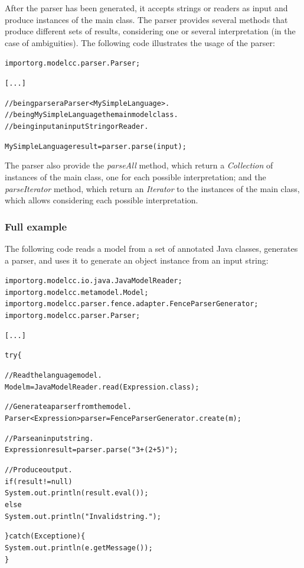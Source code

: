 \documentclass[a4paper,twoside,onecolumn]{article}
\newenvironment{colframe}{%
  \begin{Sbox} 
    \begin{minipage}{.8\columnwidth} 
}{%

  \end{minipage} 
  \end{Sbox} 
  \begin{center} 
    \fcolorbox{black}{MyGray}{\TheSbox} 
  \end{center} 
}
\begin{document}
After the parser has been generated, it accepts strings or readers as input and produce instances of the main class. The parser provides several methods that produce different sets of results, considering one or several interpretation (in the case of ambiguities). The following code illustrates the usage of the parser:

\begin{colframe}
\begin{alltt}
import org.modelcc.parser.Parser;

[...]

//being parser a Parser<MySimpleLanguage>.
//being MySimpleLanguage the main model class.
//being input an input String or Reader.

MySimpleLanguage result = parser.parse(input);
\end{alltt}
\end{colframe}

The parser also provide the \emph{parseAll} method, which return a \emph{Collection} of instances of the main class, one for each possible interpretation; and the \emph{parseIterator} method, which return an \emph{Iterator} to the instances of the main class, which allows considering each possible interpretation.

\subsubsection{Full example} \label{sec:fullexample}

The following code reads a model from a set of annotated Java classes, generates a parser, and uses it to generate an object instance from an input string:

\begin{colframe}
\begin{alltt}
import org.modelcc.io.java.JavaModelReader;
import org.modelcc.metamodel.Model;
import org.modelcc.parser.fence.adapter.FenceParserGenerator;
import org.modelcc.parser.Parser;

[...]

try \{

  // Read the language model.
  Model m = JavaModelReader.read(Expression.class);

  // Generate a parser from the model.
  Parser<Expression> parser = FenceParserGenerator.create(m);

  // Parse an input string.
  Expression result = parser.parse("3+(2+5)");

  // Produce output.
  if (result != null)
    System.out.println(result.eval());
  else
    System.out.println("Invalid string.");

\} catch (Exception e) \{
  System.out.println(e.getMessage());
\}
\end{alltt}
\end{colframe}
\end{document}
